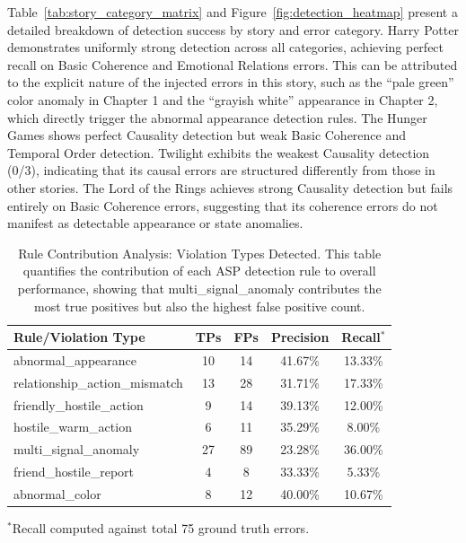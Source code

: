 Table~\ref{tab:story_category_matrix} and Figure~\ref{fig:detection_heatmap} present a detailed breakdown of detection success by story and error category. Harry Potter demonstrates uniformly strong detection across all categories, achieving perfect recall on Basic Coherence and Emotional Relations errors. This can be attributed to the explicit nature of the injected errors in this story, such as the ``pale green'' color anomaly in Chapter 1 and the ``grayish white'' appearance in Chapter 2, which directly trigger the abnormal appearance detection rules. The Hunger Games shows perfect Causality detection but weak Basic Coherence and Temporal Order detection. Twilight exhibits the weakest Causality detection (0/3), indicating that its causal errors are structured differently from those in other stories. The Lord of the Rings achieves strong Causality detection but fails entirely on Basic Coherence errors, suggesting that its coherence errors do not manifest as detectable appearance or state anomalies.

\begin{table}[htbp]
\centering
\caption{Rule Contribution Analysis: Violation Types Detected. This table quantifies the contribution of each ASP detection rule to overall performance, showing that multi\_signal\_anomaly contributes the most true positives but also the highest false positive count.}
\label{tab:rule_contribution}
\begin{tabular}{lcccc}
\toprule
\textbf{Rule/Violation Type} & \textbf{TPs} & \textbf{FPs} & \textbf{Precision} & \textbf{Recall}$^*$ \\
\midrule
abnormal\_appearance & 10 & 14 & 41.67\% & 13.33\% \\
relationship\_action\_mismatch & 13 & 28 & 31.71\% & 17.33\% \\
friendly\_hostile\_action & 9 & 14 & 39.13\% & 12.00\% \\
hostile\_warm\_action & 6 & 11 & 35.29\% & 8.00\% \\
multi\_signal\_anomaly & 27 & 89 & 23.28\% & 36.00\% \\
friend\_hostile\_report & 4 & 8 & 33.33\% & 5.33\% \\
abnormal\_color & 8 & 12 & 40.00\% & 10.67\% \\
\bottomrule
\end{tabular}
\vspace{0.5em}
\footnotesize{$^*$Recall computed against total 75 ground truth errors.}
\end{table}

